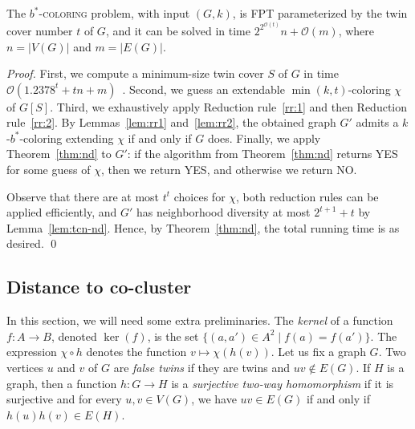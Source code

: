 \documentclass[runningheads, envcountsame]{llncs}
\newcommand{\sep}{\;|\;}
\newcommand{\ca}{\mathcal}
\newcommand{\FPT}{\textsf{FPT}\xspace}
\newcommand{\bscoloring}{$b^*$-\textsc{coloring}\xspace}
\begin{document}
\begin{theorem}
The \bscoloring problem, with input $(G, k)$, is \FPT parameterized by the twin cover number $t$ of $G$, and it can be solved in time $2^{2^{\ca O(t)}} n + \ca O(m)$, where $n = |V(G)|$ and $m = |E(G)|$.
\end{theorem}
\begin{proof}
First, we compute a minimum-size twin cover $S$ of $G$ in time $\ca O(1.2378^t + tn + m)$~\cite{ganian2011twin}.
Second, we guess an extendable $\min(k, t)$-coloring $\chi$ of $G[S]$.
Third, we exhaustively apply Reduction rule~\ref{rr:1} and then Reduction rule~\ref{rr:2}.
By Lemmas~\ref{lem:rr1} and~\ref{lem:rr2}, the obtained graph $G'$ admits a $k$-$b^*$-coloring extending $\chi$ if and only if $G$ does.
Finally, we apply Theorem~\ref{thm:nd} to $G'$: if the algorithm from Theorem~\ref{thm:nd} returns YES for some guess of $\chi$, then we return YES, and otherwise we return NO.

Observe that there are at most $t^t$ choices for $\chi$, both reduction rules can be applied efficiently, and $G'$ has neighborhood diversity at most $2^{t+1} + t$ by Lemma~\ref{lem:tcn-nd}.
Hence, by Theorem~\ref{thm:nd}, the total running time is as desired.
\qed\end{proof}

\subsection{Distance to co-cluster}

In this section, we will need some extra preliminaries.
The \emph{kernel} of a function $f\colon A \rightarrow B$, denoted $\ker(f)$, is the set $\{(a, a')\in A^2\sep f(a) = f(a')\}$.
The expression $\chi \circ h$ denotes the function $v \mapsto \chi(h(v))$.
Let us fix a graph $G$.
Two vertices $u$ and $v$ of $G$ are \emph{false twins} if they are twins and $uv \notin E(G)$.
If $H$ is a graph, then a function $h\colon G\rightarrow H$ is a \emph{surjective two-way homomorphism} if it is surjective and for every $u, v \in V(G)$, we have $uv \in E(G)$ if and only if $h(u)h(v) \in E(H)$.
\end{document}
